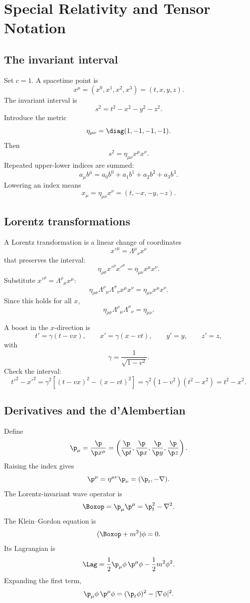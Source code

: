 \chapter{Special Relativity and Tensor Notation}

\section{The invariant interval}

Set \(c=1\).  A spacetime point is
\[
  x^\mu=(x^0,x^1,x^2,x^3)=(t,x,y,z).
\]
The invariant interval is
\[
  s^2=t^2-x^2-y^2-z^2.
\]
Introduce the metric
\[
  \eta_{\mu\nu}=\diag(1,-1,-1,-1).
\]
Then
\[
  s^2=\eta_{\mu\nu}x^\mu x^\nu.
\]
Repeated upper-lower indices are summed:
\[
  a_\mu b^\mu=a_0b^0+a_1b^1+a_2b^2+a_3b^3.
\]
Lowering an index means
\[
  x_\mu=\eta_{\mu\nu}x^\nu=(t,-x,-y,-z).
\]

\section{Lorentz transformations}

A Lorentz transformation is a linear change of coordinates
\[
  x'^\mu=\Lambda^\mu{}_\nu x^\nu
\]
that preserves the interval:
\[
  \eta_{\rho\sigma}x'^\rho x'^\sigma
  =
  \eta_{\mu\nu}x^\mu x^\nu.
\]
Substitute \(x'^\rho=\Lambda^\rho{}_\mu x^\mu\):
\[
  \eta_{\rho\sigma}\Lambda^\rho{}_\mu\Lambda^\sigma{}_\nu x^\mu x^\nu
  =
  \eta_{\mu\nu}x^\mu x^\nu.
\]
Since this holds for all \(x\),
\[
  \eta_{\rho\sigma}\Lambda^\rho{}_\mu\Lambda^\sigma{}_\nu
  =
  \eta_{\mu\nu}.
\]

A boost in the \(x\)-direction is
\[
  t'=\gamma(t-vx),\qquad
  x'=\gamma(x-vt),\qquad
  y'=y,\qquad z'=z,
\]
with
\[
  \gamma=\frac1{\sqrt{1-v^2}}.
\]
Check the interval:
\[
  t'^2-x'^2
  =
  \gamma^2[(t-vx)^2-(x-vt)^2]
  =
  \gamma^2(1-v^2)(t^2-x^2)
  =
  t^2-x^2.
\]

\section{Derivatives and the d'Alembertian}

Define
\[
  \p_\mu=\frac{\p}{\p x^\mu}
  =
  \left(\frac{\p}{\p t},\frac{\p}{\p x},\frac{\p}{\p y},\frac{\p}{\p z}\right).
\]
Raising the index gives
\[
  \p^\mu=\eta^{\mu\nu}\p_\nu
  =
  (\p_t,-\nabla).
\]
The Lorentz-invariant wave operator is
\[
  \Boxop=\p_\mu\p^\mu=\p_t^2-\nabla^2.
\]
The Klein--Gordon equation is
\[
  (\Boxop+m^2)\phi=0.
\]
Its Lagrangian is
\[
  \Lag=\frac12\p_\mu\phi\,\p^\mu\phi-\frac12m^2\phi^2.
\]
Expanding the first term,
\[
  \p_\mu\phi\,\p^\mu\phi=(\p_t\phi)^2-|\nabla\phi|^2.
\]

